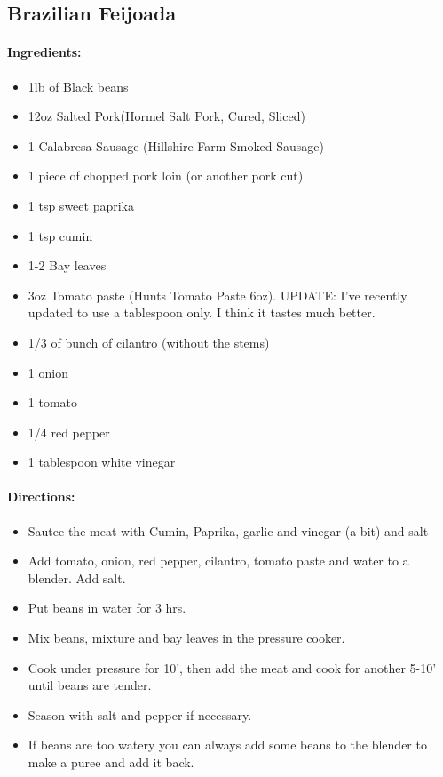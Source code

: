 \documentclass{article}
\begin{document}
\subsection{Brazilian Feijoada}

\paragraph{Ingredients:}
\begin{itemize}
    \item 1lb of Black beans
    \item 12oz Salted Pork(Hormel Salt Pork, Cured, Sliced)
    \item 1 Calabresa Sausage (Hillshire Farm Smoked Sausage)
    \item 1 piece of chopped pork loin (or another pork cut)
    \item 1 tsp sweet paprika
    \item 1 tsp cumin
    \item 1-2 Bay leaves
    \item 3oz Tomato paste (Hunts Tomato Paste 6oz). UPDATE: I've recently updated to use a tablespoon only.  I think it tastes much better.
    \item 1/3 of bunch of cilantro (without the stems)
    \item 1 onion
    \item 1 tomato
    \item 1/4 red pepper
    \item 1 tablespoon white vinegar
\end{itemize}

\paragraph{Directions:}
\begin{itemize}
    \item Sautee the meat with Cumin, Paprika, garlic and vinegar (a bit) and salt
    \item Add tomato, onion, red pepper, cilantro, tomato paste and water to a blender. Add salt.
    \item Put beans in water for 3 hrs.
    \item Mix beans, mixture and bay leaves in the pressure cooker.
    \item Cook under pressure for 10', then add the meat and cook for another 5-10' until beans are tender.
    \item Season with salt and pepper if necessary.
    \item If beans are too watery you can always add some beans to the blender to make a puree and add it back.
\end{itemize}
\end{document}
